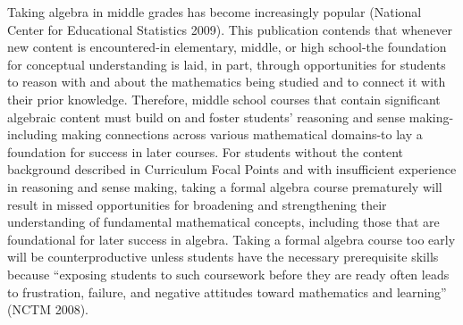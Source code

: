 {{      Taking algebra in middle grades has become increasingly popular (National Center for Educational Statistics 2009). This publication contends that whenever new content is encountered-in elementary, middle, or high school-the foundation for conceptual understanding is laid, in part, through opportunities for students to reason with and about the mathematics being studied and to connect it with their prior knowledge. Therefore, middle school courses that contain significant algebraic content must build on and foster students' reasoning and sense making-including making connections across various mathematical domains-to lay a foundation for success in later courses. For students without the content background described in Curriculum Focal Points and with insufficient experience in reasoning and sense making, taking a formal algebra course prematurely will result in missed opportunities for broadening and strengthening their understanding of fundamental mathematical concepts, including those that are foundational for later success in algebra. Taking a formal algebra course too early will be counterproductive unless students have the necessary prerequisite skills because ``exposing students to such coursework before they are ready often leads to frustration, failure, and negative attitudes toward mathematics and learning'' (NCTM 2008).}
  }
